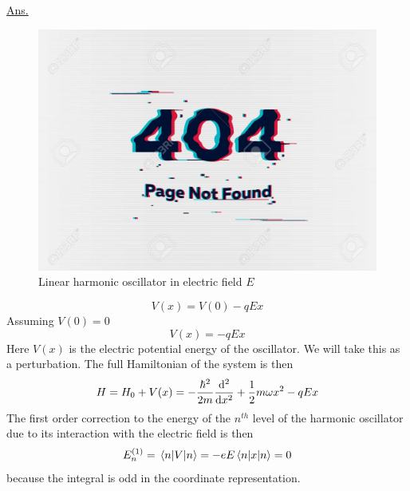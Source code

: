 \begin{enumerate}[label=Problem.\arabic*,start=1]
			\underline{Ans.}\\
			\begin{figure}
				\centering
				\includegraphics[width=0.5\linewidth]{Pictures/not-found.jpg}
				\caption{Linear harmonic oscillator in electric field $E$}
			\end{figure}
		\begin{equation}
			V(x) = V(0) - q E x
		\end{equation}
		Assuming $V(0) = 0$
		\begin{equation}
			V(x) =  - q E x
		\end{equation}
			Here $V(x)$ is the electric potential energy of the oscillator. We will take this as a perturbation. The full Hamiltonian of the system is then
			\begin{equation}
				H = H_0 + V(x) = - \frac{\hbar^2}{2 m} \dv[2]{}{x} + \frac{1}{2} m \omega x^2 - q E x
			\end{equation}
			The first order correction to the energy of the $n^{th}$ level of the harmonic oscillator due to its interaction with the electric field is then
			\begin{equation}
				E_n^{(1)} = \expval{V}{n} = -e E \expval{x}{n} = 0
			\end{equation}
			because the integral is odd in the coordinate representation.\\
			

\end{enumerate}
